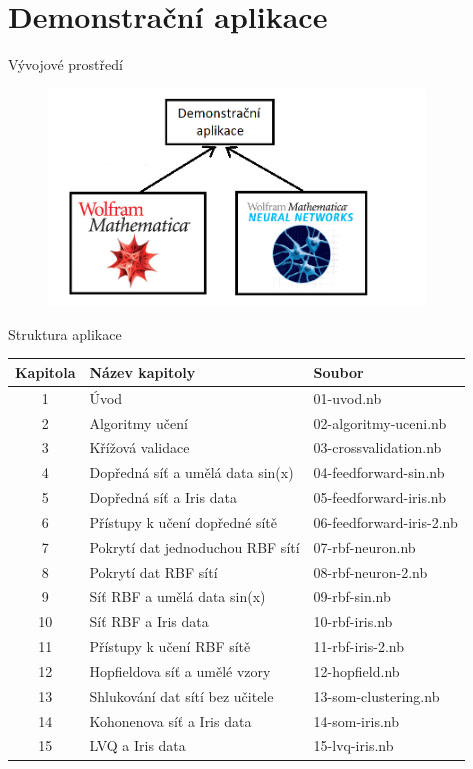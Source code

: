 \documentclass{beamer}
\begin{document}
\section{Demonstrační aplikace}
\begin{frame}{Vývojové prostředí}
\begin{figure}
   \includegraphics[width=10cm]{schema.png}
\end{figure}
\end{frame}

\begin{frame}{Struktura aplikace}
\begin{footnotesize}
\begin{table}[t]
\begin{tabular}{|c|l|l|}
\hline 
Kapitola & Název kapitoly & Soubor \\ \hline
1 & Úvod & 01-uvod.nb \\ \hline
2 & Algoritmy učení & 02-algoritmy-uceni.nb \\ \hline
3 & Křížová validace & 03-crossvalidation.nb \\ \hline
4 & Dopředná síť a umělá data sin(x) & 04-feedforward-sin.nb \\ \hline
5 & Dopředná síť a Iris data & 05-feedforward-iris.nb \\ \hline
6 & Přístupy k učení dopředné sítě & 06-feedforward-iris-2.nb \\ \hline
7 & Pokrytí dat jednoduchou RBF sítí & 07-rbf-neuron.nb \\ \hline
8 & Pokrytí dat RBF sítí & 08-rbf-neuron-2.nb \\ \hline
9 & Síť RBF a umělá data sin(x) & 09-rbf-sin.nb \\ \hline
10 & Síť RBF a Iris data & 10-rbf-iris.nb \\ \hline
11 & Přístupy k učení RBF sítě & 11-rbf-iris-2.nb \\ \hline
12 & Hopfieldova síť a umělé vzory & 12-hopfield.nb \\ \hline
13 & Shlukování dat sítí bez učitele & 13-som-clustering.nb \\ \hline
14 & Kohonenova síť a Iris data & 14-som-iris.nb \\ \hline
15 & LVQ a Iris data & 15-lvq-iris.nb \\ \hline
\end{tabular}
\label{tab:aplikace}
\end{table}
\end{footnotesize}
\end{frame}
\end{document}
